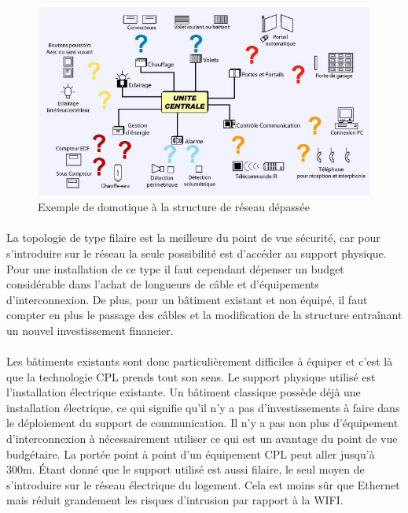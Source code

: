         \begin{figure}[h]
            \begin{center}
                \includegraphics[scale=0.4]{./images/cpl/imageUniteCentrale.jpg}
            \end{center}
                \caption{ Exemple de domotique à la structure de réseau dépassée } %
                \label{Exemple de domotique avec commande centrale}
        \end{figure}

    \paragraph{}
La topologie de type filaire est la meilleure du point de vue sécurité, car pour s'introduire sur le réseau la seule possibilité est d’accéder au support physique.
Pour une installation de ce type il faut cependant dépenser un budget considérable dans l’achat de longueurs de câble et d'équipements d’interconnexion.
De plus, pour un bâtiment existant et non équipé, il faut compter en plus le passage des câbles et la modification de la structure entraînant un nouvel investissement financier.
    \paragraph{}
Les bâtiments existants sont donc particulièrement difficiles à équiper et c’est là que la technologie CPL prends tout son sens.
Le support physique utilisé est l’installation électrique existante.
Un bâtiment classique possède déjà une installation électrique, ce qui signifie qu'il n'y a pas d’investissements à faire dans le déploiement du support de communication.
Il n’y a pas non plus d’équipement d’interconnexion à nécessairement utiliser ce qui est un avantage du point de vue budgétaire.
La portée point à point d’un équipement CPL peut aller jusqu’à 300m.
Étant donné que le support utilisé est aussi filaire, le seul moyen de s’introduire sur le réseau électrique du logement.
Cela est moins sûr que Ethernet mais réduit grandement les risques d’intrusion par rapport à la WIFI.


